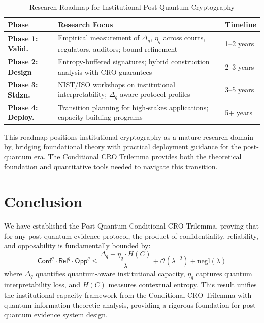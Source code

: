 \documentclass{ieeeaccess}
\newcommand{\Conf}{\mathsf{Conf}}
\newcommand{\Rel}{\mathsf{Rel}}
\newcommand{\Opp}{\mathsf{Opp}}
\begin{document}
\begin{table}[h]
\centering
\caption{Research Roadmap for Institutional Post-Quantum Cryptography}
\label{tab:roadmap}
\small
\setlength{\tabcolsep}{3pt}
\begin{tabular}{p{2.2cm}p{4.2cm}p{2.0cm}}
\toprule
\textbf{Phase} & \textbf{Research Focus} & \textbf{Timeline} \\
\midrule
\textbf{Phase 1: Valid.} & Empirical measurement of $\Delta_q$, $\eta_q$ across courts, 
                           regulators, auditors; bound refinement & 1--2 years \\
\textbf{Phase 2: Design} & Entropy-buffered signatures; hybrid construction 
                            analysis with CRO guarantees & 2--3 years \\
\textbf{Phase 3: Stdzn.} & NIST/ISO workshops on institutional interpretability; 
                            $\Delta_q$-aware protocol profiles & 3--5 years \\
\textbf{Phase 4: Deploy.} & Transition planning for high-stakes applications; 
                             capacity-building programs & 5+ years \\
\bottomrule
\end{tabular}
\end{table}
This roadmap positions institutional cryptography as a mature research domain by, 
bridging foundational theory with practical deployment guidance for the 
post-quantum era. The Conditional CRO Trilemma provides both the theoretical 
foundation and quantitative tools needed to navigate this transition.
\section{Conclusion}\label{sec:conclusion}

We have established the Post-Quantum Conditional CRO Trilemma, proving that for any 
post-quantum evidence protocol, the product of confidentiality, reliability, and 
opposability is fundamentally bounded by:
\[
\Conf^q \cdot \Rel^q \cdot \Opp^q \leq \frac{\Delta_q + \eta_q \cdot H(C)}{\lambda} + \mathcal{O}(\lambda^{-2}) + \text{negl}(\lambda)
\]
where $\Delta_q$ quantifies quantum-aware institutional capacity, $\eta_q$ captures 
quantum interpretability loss, and $H(C)$ measures contextual entropy. This result 
unifies the institutional capacity framework from the Conditional CRO Trilemma with 
quantum information-theoretic analysis, providing a rigorous foundation for 
post-quantum evidence system design.
\end{document}
